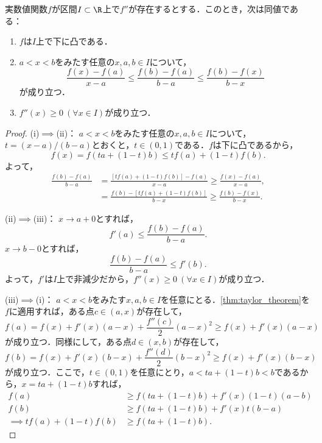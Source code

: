 \documentclass[a4paper,10pt]{ltjsarticle}
\begin{document}
\begin{MyTheorem}
  実数値関数\(f\)が区間\(I \subset \R\)上で\(f''\)が存在するとする．このとき，次は同値である：
  \begin{enumerate}
    \item \(f\)は\(I\)上で下に凸である．
    \item \(a < x < b\)をみたす任意の\(x, a, b \in I\)について，
          \[ \frac{f(x) - f(a)}{x - a} \le \frac{f(b) - f(a)}{b - a} \le \frac{f(b) - f(x)}{b - x} \]
          が成り立つ．
    \item \(f''(x) \ge 0 \ (\forall x \in I)\)が成り立つ．
  \end{enumerate}
\end{MyTheorem}
\begin{proof}
  (i)\(\implies\)(ii)： \(a < x < b\)をみたす任意の\(x, a, b \in I\)について，\(t = (x - a)/(b - a)\)とおくと，\(t \in (0, 1)\)である．\(f\)は下に凸であるから，
  \[ f(x) = f(ta + (1-t)b) \le tf(a) + (1-t)f(b).\]
  よって，
  \begin{align*}
    \frac{f(b) - f(a)}{b - a} & = \frac{[tf(a) + (1 - t)f(b)] - f(a)}{x - a} \ge \frac{f(x) - f(a)}{x - a}, \\
                              & = \frac{f(b) - [tf(a) + (1 - t)f(b)]}{b - x} \ge \frac{f(b) - f(x)}{b - x}.
  \end{align*}

  (ii)\(\implies\)(iii)： \(x \to a+0\)とすれば，
  \[ f'(a) \le \frac{f(b) - f(a)}{b - a}.\]
  \(x \to b-0\)とすれば，
  \[ \frac{f(b) - f(a)}{b - a} \le f'(b). \]
  よって，\(f'\)は\(I\)上で非減少だから，\(f''(x) \ge 0 \ (\forall x \in I)\)が成り立つ．

  (iii)\(\implies\)(i)： \(a < x < b\)をみたす\(x, a, b \in I\)を任意にとる．\cref{thm:taylor_theorem}を\(f\)に適用すれば，ある点\(c \in (a, x)\)が存在して，
  \[ f(a) = f(x) + f'(x)(a - x) + \frac{f''(c)}{2}(a - x)^2 \ge f(x) + f'(x)(a - x) \]
  が成り立つ．同様にして，ある点\(d \in (x, b)\)が存在して，
  \[ f(b) = f(x) + f'(x)(b - x) + \frac{f''(d)}{2}(b - x)^2 \ge f(x) + f'(x)(b - x) \]
  が成り立つ．ここで，\(t\in(0,1)\)を任意にとり，\(a < ta + (1-t)b < b\)であるから，\(x = ta + (1-t)b\)すれば，
  \begin{align*}
    f(a)                       & \ge f(ta + (1-t)b) + f'(x)(1-t)(a - b) \\
    f(b)                       & \ge f(ta + (1-t)b) + f'(x)t(b - a)     \\
    \implies tf(a) + (1-t)f(b) & \ge f(ta + (1-t)b).
  \end{align*}
\end{proof}
\end{document}
